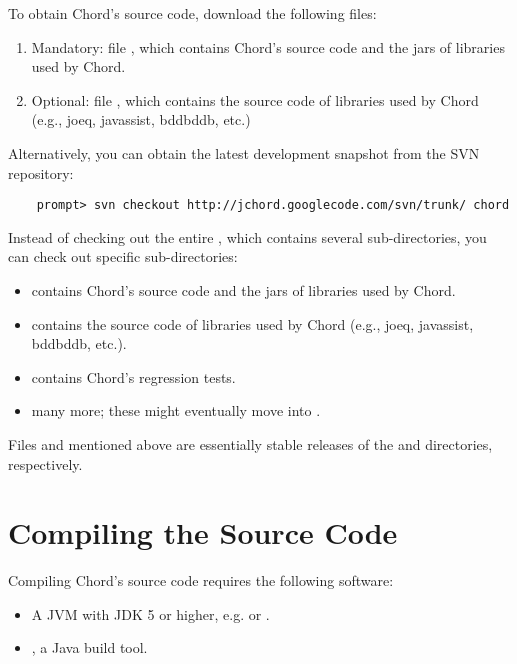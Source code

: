 To obtain Chord's source code, download the following files:

\begin{enumerate}
\item
Mandatory: file , which contains Chord's source code and the jars of libraries used by Chord.
\item
Optional: file , which contains the source
code of libraries used by Chord (e.g., joeq, javassist, bddbddb, etc.)
\end{enumerate}

Alternatively, you can obtain the latest development snapshot from the SVN repository:

\begin{verbatim}
    prompt> svn checkout http://jchord.googlecode.com/svn/trunk/ chord
\end{verbatim}

Instead of checking out the entire , which contains several sub-directories, you can check out
specific sub-directories:
\begin{itemize}
\item {} contains Chord's source code and the jars of libraries used by Chord.
\item {} contains the source code of libraries used by Chord (e.g., joeq, javassist, bddbddb, etc.).
\item {} contains Chord's regression tests.
\item many more; these might eventually move into .
\end{itemize}

Files  and  mentioned above are essentially stable releases of
the  and  directories, respectively. 

\section{Compiling the Source Code}
\label{sec:compiling-sources}

Compiling Chord's source code requires the following software:

\begin{itemize}
\item
A JVM with JDK 5 or higher, e.g.  or
.
\item
{}, a Java build tool.
\end{itemize}


